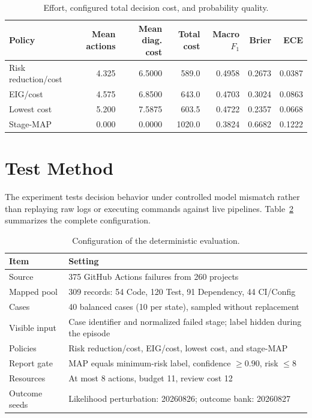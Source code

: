 \documentclass{article}
\begin{document}
\begin{table}[!b]
\renewcommand{\arraystretch}{1.2}
\centering
\caption{Effort, configured total decision cost, and probability quality.}
\label{tab:quality_results}
\footnotesize
\begin{tabular*}{\textwidth}{@{\extracolsep{\fill}}lrrrrrr@{}}
\toprule
Policy & Mean actions & Mean diag. cost & Total cost &
Macro $F_1$ & Brier & ECE \\
\midrule
Risk reduction/cost & 4.325 & 6.5000 & 589.0  & 0.4958 & 0.2673 & 0.0387 \\
EIG/cost            & 4.575 & 6.8500 & 643.0  & 0.4703 & 0.3024 & 0.0863 \\
Lowest cost         & 5.200 & 7.5875 & 603.5  & 0.4722 & 0.2357 & 0.0668 \\
Stage-MAP           & 0.000 & 0.0000 & 1020.0 & 0.3824 & 0.6682 & 0.1222 \\
\bottomrule
\end{tabular*}
\end{table}



\section{Test Method}
\label{sec:test_method}

The experiment tests decision behavior under controlled model mismatch rather
than replaying raw logs or executing commands against live pipelines.
Table~\ref{tab:test_configuration} summarizes the complete configuration.

\begin{table}[!h]
\renewcommand{\arraystretch}{1.2}
\centering
\caption{Configuration of the deterministic evaluation.}
\label{tab:test_configuration}
\footnotesize
\begin{tabularx}{\columnwidth}{@{}lX@{}}
\toprule
Item & Setting \\
\midrule
Source & 375 GitHub Actions failures from 260 projects
~\cite{Zheng2026WorkflowFailures} \\
Mapped pool & 309 records: 54 Code, 120 Test, 91 Dependency, 44 CI/Config \\
Cases & 40 balanced cases (10 per state), sampled without replacement \\
Visible input & Case identifier and normalized failed stage; label hidden
during the episode \\
Policies & Risk reduction/cost, EIG/cost, lowest cost, and stage-MAP \\
Report gate & MAP equals minimum-risk label, confidence $\geq0.90$, risk
$\leq8$ \\
Resources & At most 8 actions, budget 11, review cost 12 \\
Outcome seeds & Likelihood perturbation: 20260826; outcome bank: 20260827 \\
\bottomrule
\end{tabularx}
\end{table}
\end{document}
